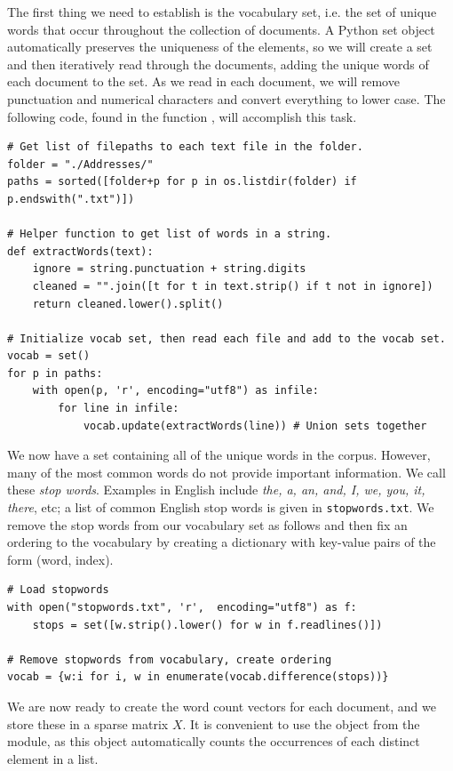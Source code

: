 The first thing we need to establish is the vocabulary set, i.e. the set of unique words that occur throughout the collection of documents.
A Python set object automatically preserves the uniqueness of the elements, so we will create a set and then iteratively read through the documents, adding the unique words of each document to the set.
As we read in each document, we will remove punctuation and numerical characters and convert everything to lower case.
The following code, found in the function , will accomplish this task. 

\begin{lstlisting}
# Get list of filepaths to each text file in the folder.
folder = "./Addresses/"
paths = sorted([folder+p for p in os.listdir(folder) if p.endswith(".txt")])

# Helper function to get list of words in a string.
def extractWords(text):
    ignore = string.punctuation + string.digits
    cleaned = "".join([t for t in text.strip() if t not in ignore])
    return cleaned.lower().split()

# Initialize vocab set, then read each file and add to the vocab set.
vocab = set()
for p in paths:
    with open(p, 'r', encoding="utf8") as infile:
        for line in infile:
            vocab.update(extractWords(line)) # Union sets together
\end{lstlisting}

We now have a set containing all of the unique words in the corpus.
However, many of the most common words do not provide important information.
We call these \emph{stop words}. Examples in English include \emph{the, a, an, and, I, we, you, it, there}, etc; a list of common English stop words is given in \texttt{stopwords.txt}.
We remove the stop words from our vocabulary set as follows and then fix an ordering to the vocabulary by creating a dictionary
with key-value pairs of the form (word, index).

\begin{lstlisting}
# Load stopwords
with open("stopwords.txt", 'r',  encoding="utf8") as f:
    stops = set([w.strip().lower() for w in f.readlines()])

# Remove stopwords from vocabulary, create ordering
vocab = {w:i for i, w in enumerate(vocab.difference(stops))}
\end{lstlisting}

We are now ready to create the word count vectors for each document, and we store these in a sparse matrix $X$.
It is convenient to use the  object from the  module, as this object automatically counts the occurrences of each distinct element in a list.

